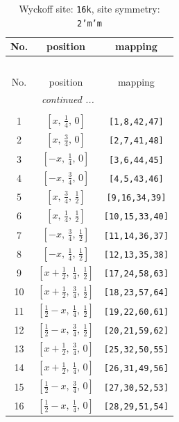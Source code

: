 \documentclass[fleqn,8pt]{jsarticle}
\begin{document}
\renewcommand{\arraystretch}{1.2}
\begin{longtable}{ccc}
\caption{Wyckoff site: {\tt 16k}, site symmetry: {\tt 2'm'm}}
 \\
 \hline \hline
No. & position & mapping \\ \hline \endfirsthead

\multicolumn{2}{l}{\tablename\ \thetable{}} \\
 \hline \hline
No. & position & mapping \\ \hline \endhead

 \hline \hline
\multicolumn{2}{r}{\footnotesize\it continued ...} \\ \endfoot

 \hline \hline
\multicolumn{2}{r}{} \\ \endlastfoot

1 & $\left[ x,\, \frac{1}{4},\, 0 \right]$ & {\tt [1,8,42,47]} \\ \hline
2 & $\left[ x,\, \frac{3}{4},\, 0 \right]$ & {\tt [2,7,41,48]} \\ \hline
3 & $\left[ - x,\, \frac{1}{4},\, 0 \right]$ & {\tt [3,6,44,45]} \\ \hline
4 & $\left[ - x,\, \frac{3}{4},\, 0 \right]$ & {\tt [4,5,43,46]} \\ \hline
5 & $\left[ x,\, \frac{3}{4},\, \frac{1}{2} \right]$ & {\tt [9,16,34,39]} \\ \hline
6 & $\left[ x,\, \frac{1}{4},\, \frac{1}{2} \right]$ & {\tt [10,15,33,40]} \\ \hline
7 & $\left[ - x,\, \frac{3}{4},\, \frac{1}{2} \right]$ & {\tt [11,14,36,37]} \\ \hline
8 & $\left[ - x,\, \frac{1}{4},\, \frac{1}{2} \right]$ & {\tt [12,13,35,38]} \\ \hline
9 & $\left[ x + \frac{1}{2},\, \frac{1}{4},\, \frac{1}{2} \right]$ & {\tt [17,24,58,63]} \\ \hline
10 & $\left[ x + \frac{1}{2},\, \frac{3}{4},\, \frac{1}{2} \right]$ & {\tt [18,23,57,64]} \\ \hline
11 & $\left[ \frac{1}{2} - x,\, \frac{1}{4},\, \frac{1}{2} \right]$ & {\tt [19,22,60,61]} \\ \hline
12 & $\left[ \frac{1}{2} - x,\, \frac{3}{4},\, \frac{1}{2} \right]$ & {\tt [20,21,59,62]} \\ \hline
13 & $\left[ x + \frac{1}{2},\, \frac{3}{4},\, 0 \right]$ & {\tt [25,32,50,55]} \\ \hline
14 & $\left[ x + \frac{1}{2},\, \frac{1}{4},\, 0 \right]$ & {\tt [26,31,49,56]} \\ \hline
15 & $\left[ \frac{1}{2} - x,\, \frac{3}{4},\, 0 \right]$ & {\tt [27,30,52,53]} \\ \hline
16 & $\left[ \frac{1}{2} - x,\, \frac{1}{4},\, 0 \right]$ & {\tt [28,29,51,54]} \\
\end{longtable}
\end{document}
